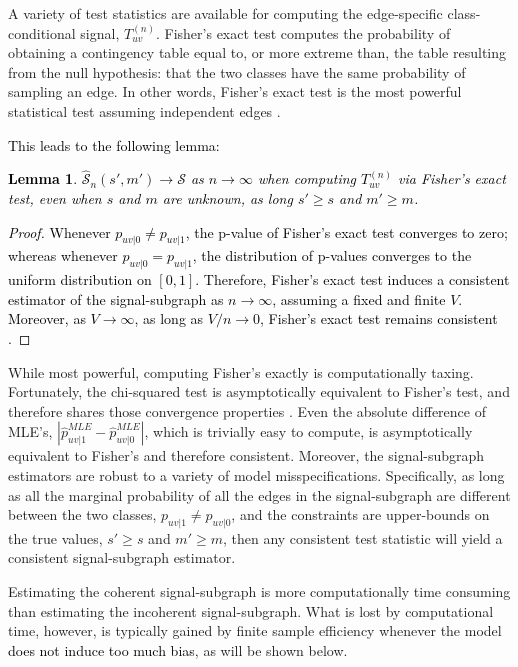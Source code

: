 \documentclass[10pt,journal,cspaper,compsoc]{IEEEtran}
\providecommand{\tk}[1]{\textcolor{black}{#1}}
\providecommand{\mc}[1]{\mathcal{#1}}
\providecommand{\wh}[1]{\widehat{#1}}
\providecommand{\mhc}[1]{\widehat{\mathcal{#1}}}
\newcommand{\conv}{\rightarrow}
\newtheorem{Lem}{Lemma}[section]
\newcommand{\comment}[1]{}
\begin{document}
A variety of test statistics are available for computing the edge-specific class-conditional signal, $T_{uv}^{(n)}$.  Fisher's exact test computes the probability of obtaining a contingency table equal to, or more extreme than, the table resulting from the null hypothesis: that the two classes have the same probability of sampling an edge.  In other words, Fisher's exact test is the most powerful statistical test assuming independent edges \cite{Rice1995}.  \tk{This leads to the following lemma:
% 
\begin{Lem}
	$\mhc{S}_n(s',m') \to \mc{S}$ as $n \to \infty$ when computing $T_{uv}^{(n)}$ via Fisher's exact test, even when $s$ and $m$ are unknown, as long $s' \geq s$ and $m' \geq m$. 
\end{Lem}
\begin{proof}
	Whenever $p_{uv|0}\neq p_{uv|1}$, the p-value of Fisher's exact test converges to zero; whereas whenever $p_{uv|0}=p_{uv|1}$, the distribution of p-values converges to the uniform distribution on $[0,1]$.  Therefore, Fisher's exact test induces a consistent estimator of the signal-subgraph as $n \conv \infty$, assuming a fixed and finite $V$.  Moreover, as $V \conv \infty$, as long as $V/n \conv 0$, Fisher's exact test remains consistent \cite{Rice1995}. 
\end{proof}
}
While most powerful, computing Fisher's exactly is computationally taxing.  Fortunately, the chi-squared test is asymptotically equivalent to Fisher's test, and therefore shares those convergence properties \cite{Rice1995}.  Even the absolute difference of MLE's, $|\wh{p}_{uv|1}^{MLE}-\wh{p}_{uv|0}^{MLE}|$, which is trivially easy to compute, is asymptotically equivalent to Fisher's \cite{Rice1995} and therefore consistent. 
% 
\comment{The implications of the above convergence properties are that any incoherent signal-subgraph estimated using a consistent test statistic is a consistent signal-subgraph estimator.}  Moreover, the signal-subgraph estimators are robust to a variety of model misspecifications.  Specifically, as long as all the marginal probability of all the edges in the signal-subgraph are different between the two classes, $p_{uv|1}\neq p_{uv|0}$,  and the constraints are upper-bounds on the true values, $s' \geq s$ and $m' \geq m$, 
then any consistent test statistic will yield a consistent signal-subgraph estimator.  \comment{For example, when the signal-subgraph is coherent, even if $m$ is unknown, the incoherent signal-subgraph estimator will converge to the truth.  More generally, even if the independent edge assumption is not satisfied, the incoherent estimator will converge to the truth.}
% 
\comment{Moreover, the coherent signal-subgraph estimator uses the same test statistics.  Thus, it shares the above consistency and robustness properties. } 
Estimating the coherent signal-subgraph is more computationally time consuming than estimating the incoherent signal-subgraph.
What is lost by computational time, however, is typically gained by finite sample efficiency whenever the model  \comment{is coherent} \tk{does not induce too much bias}, as will be shown below.
\end{document}
